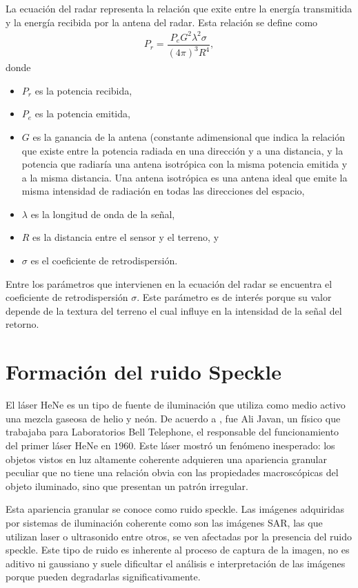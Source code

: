 La ecuación del radar representa la relación que exite entre la energía transmitida y la energía recibida por la antena del radar. Esta relación se define como
\begin{align}
P_r=\dfrac{P_e G^2 \lambda^2 \sigma}{(4 \pi)^3 R^4} ,
\end{align}
donde
\begin{itemize}
	\item $P_r$ es la potencia recibida,
	\item $P_e$ es la potencia emitida,
	\item $G$ es la ganancia de la antena (constante adimensional que indica la relación que existe entre la potencia radiada en una dirección y a una distancia, y la  potencia que radiaría una antena isotrópica con la misma potencia emitida y a la misma distancia. Una antena isotrópica es una antena ideal que emite la misma intensidad de radiación en todas las direcciones del espacio,
	\item $\lambda$ es la longitud de onda de la señal,
	\item $R$ es la distancia entre el sensor y el terreno, y
	\item $\sigma$ es el coeficiente de retrodispersión.
\end{itemize}

Entre los parámetros que intervienen en la ecuación del radar se encuentra el coeficiente de retrodispersión $\sigma$. Este parámetro es de interés porque su valor depende de la textura del terreno el cual influye en la intensidad de la señal del retorno.

\section{Formación del ruido Speckle}
\label{FormacionSpeckle}

El láser HeNe es un tipo de fuente de iluminación que utiliza como medio activo una mezcla gaseosa de helio y neón. 
De acuerdo a \citet{Goodman1975}, fue Ali Javan, un físico que trabajaba para Laboratorios Bell Telephone, el responsable del funcionamiento del primer láser HeNe en $1960$. 
Este láser  mostró un fenómeno inesperado: los objetos vistos en luz altamente coherente adquieren una apariencia granular peculiar que no tiene una relación obvia con las propiedades macroscópicas del objeto iluminado, sino que presentan un patrón irregular. 

Esta apariencia granular se conoce como ruido speckle. Las imágenes adquiridas por sistemas de iluminación coherente como son las imágenes SAR, las que utilizan laser o ultrasonido entre otros, se ven afectadas por la presencia del ruido speckle. Este tipo de ruido es inherente al proceso de captura de la imagen, no es aditivo ni gaussiano y suele dificultar el análisis e interpretación de las imágenes porque pueden degradarlas significativamente.


